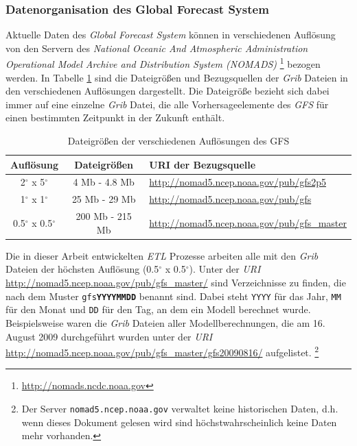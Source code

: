 \subsubsection{Datenorganisation des Global Forecast System}

Aktuelle Daten des \textit{Global Forecast System} können in
verschiedenen Auflösung von den Servern des \textit{National Oceanic
  And Atmospheric Administration Operational Model Archive and
  Distribution System (NOMADS)} 
\footnote{\url{http://nomads.ncdc.noaa.gov}} bezogen werden. In
Tabelle \ref{tab:gfs_auflösungen} sind die Dateigrößen und
Bezugsquellen der \textit{Grib} Dateien in den verschiedenen
Auflösungen dargestellt. Die Dateigröße bezieht sich dabei immer auf
eine einzelne \textit{Grib} Datei, die alle Vorhersageelemente des
\textit{GFS} für einen bestimmten Zeitpunkt in der Zukunft enthält.

\begin{table}[h]
  \centering
  {\sf
    \footnotesize
    \begin{longtable}{@{}ccl}

      \toprule
      \textbf{Auflösung} & \textbf{Dateigrößen} & \textbf{URI der Bezugsquelle} \\

      \midrule

      2$^{\circ}$ x 5$^{\circ}$ & 4 Mb - 4.8 Mb & \url{http://nomad5.ncep.noaa.gov/pub/gfs2p5} \\
      1$^{\circ}$ x 1$^{\circ}$ & 25 Mb - 29 Mb & \url{http://nomad5.ncep.noaa.gov/pub/gfs} \\
      0.5$^{\circ}$ x 0.5$^{\circ}$ & 200 Mb - 215 Mb & \url{http://nomad5.ncep.noaa.gov/pub/gfs_master} \\

      \bottomrule

    \end{longtable}
  }

  \caption{Dateigrößen der verschiedenen Auflösungen des GFS}
  \label{tab:gfs_auflösungen}

\end{table}

Die in dieser Arbeit entwickelten \textit{ETL} Prozesse arbeiten alle
mit den \textit{Grib} Dateien der höchsten Auflösung
(0.5$^{\circ}$ x 0.5$^{\circ}$). Unter der \textit{URI}
\url{http://nomad5.ncep.noaa.gov/pub/gfs_master/} sind Verzeichnisse
zu finden, die nach dem Muster \texttt{gfs\textbf{YYYYMMDD}} benannt
sind. Dabei steht \texttt{YYYY} für das Jahr, \texttt{MM} für den
Monat und \texttt{DD} für den Tag, an dem ein Modell berechnet
wurde. Beispielsweise waren die \textit{Grib} Dateien aller
Modellberechnungen, die am 16. August 2009 durchgeführt wurden unter
der \textit{URI}
\url{http://nomad5.ncep.noaa.gov/pub/gfs_master/gfs20090816/}
aufgelistet.  \footnote{Der Server \texttt{nomad5.ncep.noaa.gov}
  verwaltet keine historischen Daten, d.h. wenn dieses Dokument
  gelesen wird sind höchstwahrscheinlich keine Daten mehr vorhanden.}

